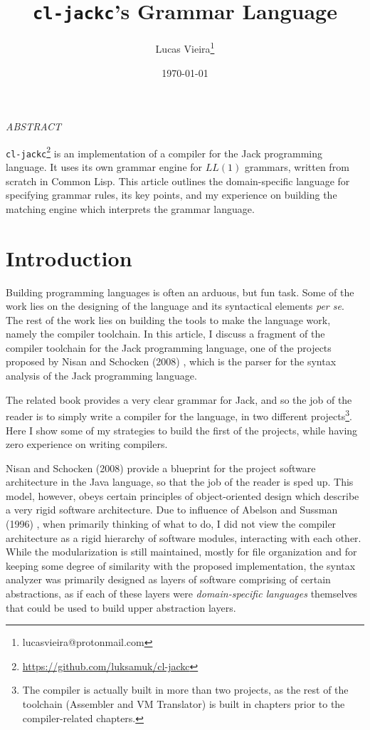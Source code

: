 \documentclass[a4paper,11pt,oneside]{article}
\author{Lucas Vieira\thanks{lucasvieira@protonmail.com}}
\date{\today}
\title{\texttt{cl-jackc}'s Grammar Language}
\begin{document}
\maketitle
\begin{center}
\emph{ABSTRACT}
\end{center}

\par\noindent
\texttt{cl-jackc}\footnote{\url{https://github.com/luksamuk/cl-jackc}} is an implementation of a compiler for the Jack
programming language. It uses its own grammar engine for \(LL(1)\)
grammars, written from scratch in Common Lisp. This article outlines
the domain-specific language for specifying grammar rules, its key
points, and my experience on building the matching engine which
interprets the grammar language.


\section{Introduction}
\label{sec:org1870824}

Building programming languages is often an arduous, but fun task. Some
of the work lies on the designing of the language and its syntactical
elements \emph{per se}. The rest of the work lies on building the tools
to make the language work, namely the compiler toolchain. In this
article, I discuss a fragment of the compiler toolchain for the Jack
programming language, one of the projects proposed by Nisan and
Schocken (2008) \cite{nand2tetris}, which is the parser for the syntax
analysis of the Jack programming language.

The related book provides a very clear grammar for Jack, and so the
job of the reader is to simply write a compiler for the language, in
two different projects\footnote{The compiler is actually built in more than two projects, as
the rest of the toolchain (Assembler and VM Translator) is built in
chapters prior to the compiler-related chapters.}. Here I show some of my strategies to
build the first of the projects, while having zero experience on
writing compilers.

Nisan and Schocken (2008) \cite{nand2tetris} provide a blueprint for the
project software architecture in the Java language, so that the job of
the reader is sped up. This model, however, obeys certain principles
of object-oriented design which describe a very rigid software
architecture. Due to influence of Abelson and Sussman (1996)
\cite{sicp}, when primarily thinking of what to do, I did not view the
compiler architecture as a rigid hierarchy of software modules,
interacting with each other. While the modularization is still
maintained, mostly for file organization and for keeping some degree
of similarity with the proposed implementation, the syntax analyzer
was primarily designed as layers of software comprising of certain
abstractions, as if each of these layers were \emph{domain-specific
languages} themselves that could be used to build upper abstraction
layers.
\end{document}
